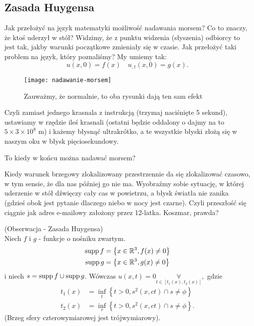 \documentclass[../main.tex]{subfiles}
\begin{document}
\subsection{Zasada Huygensa}
Jak przełożyć na język matematyki możliwość nadawania morsem? Co to znaczy, że ktoś uderzył w stół? Widzimy, że z punktu widzenia (słyszenia) odbiorcy to jest tak, jakby warunki początkowe zmieniały się w czasie. Jak przełożyć taki problem na język, który poznaliśmy?
My umiemy tak:
\[
		u(x,0) = f(x)\quad u_{,t}(x,0) = g(x)
.\]
\begin{figure}[h]
		\centering
		\texttt{[image: nadawanie-morsem]}
		\caption{Zauważmy, że normalnie, to oba rysunki dają ten sam efekt}
		\label{fig:nadawanie-morsem}
\end{figure}
Czyli zamiast jednego krasnala z instrukcją (trzymaj naciśnięte 5 sekund), ustawiamy w rzędzie ileś krasnali (ostatni będzie oddalony o dajmy na to $5 \times 3 \times 10^8$ m) i każemy błysnąć ultrakrótko, a te wszystkie błyski złożą się w naszym oku w błysk pięciosekundowy.\\
\begin{pytanie}
		To kiedy w końcu można nadawać morsem?
\end{pytanie}
Kiedy warunek brzegowy zlokalizowany przestrzennie da się zlokalizować czasowo, w tym sensie, że dla nas później go nie ma. Wyobraźmy sobie sytuację, w której uderzenie w stół dźwięczy cały cas w powietrzu, a błysk światła nie zanika (gdzieś obok jest pytanie dlaczego niebo w nocy jest czarne). Czyli przeszłość się ciągnie jak adres e-mailowy założony przez 12-latka. Koszmar, prawda?\\
\begin{tw}
		(Obserwacja - Zasada Huygensa)\\
		Niech $f$ i $g$ - funkcje o nośniku zwartym.
		\begin{align*}
				\operatorname{supp} f &= \left\{ x\in \mathbb{R}^3, f(x) \neq 0 \right\}\\
				\operatorname{supp} g &= \left\{ x\in \mathbb{R}^3, g(x) \neq 0 \right\}
		\end{align*}
		i niech $s = \operatorname{supp} f \cup \operatorname{supp} g$. Wówczas $u(x,t) = 0 \underset{t\in [t_1(x),t_2(x)]}{\forall},$ gdzie
		\begin{align*}
				t_1(x) &= \underset{t}{\inf} \left\{ t>0, s^2(x,ct) \cap s \neq \phi \right\}\\
				t_2(x) &= \underset{r}{\inf} \left\{ t>0, s^2(x,ct) \cap s \neq \phi \right\}
		.\end{align*}
		(Brzeg sfery czterowymiarowej jest trójwymiarowy). \\
\end{tw}
\end{document}

